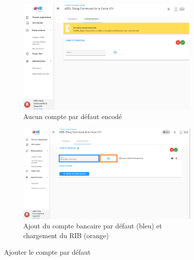 \begin{figure}[!h]
    \centering
    \begin{subfigure}[t]{0.49\textwidth}
         \centering
         \includegraphics[width=\textwidth]{Images/gcb/gcb_compteprincipal.png}
         \caption{Aucun compte par défaut encodé}
         \label{subfig:gcb_compteprincipal}
     \end{subfigure}
     \hfill
    \begin{subfigure}[t]{0.49\textwidth}
         \centering
         \includegraphics[width=\textwidth]{Images/gcb/gcb_compteprincipalcreate.png}
         \caption{Ajout du compte bancaire par défaut (bleu) et chargement du RIB (orange)}
         \label{subfig:gcb_compteprincipalcreate}
     \end{subfigure}
    
    \caption{Ajouter le compte par défaut}
    \label{fig:gcb_compte_par_défaut}
\end{figure}
